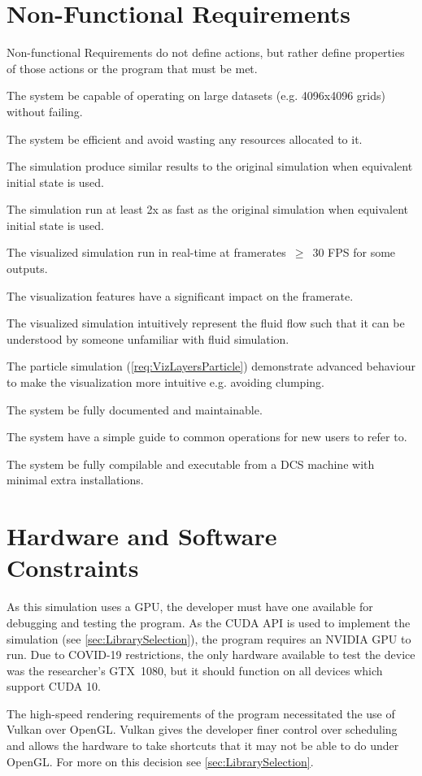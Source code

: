 \section{Non-Functional Requirements}
Non-functional Requirements do not define actions, but rather define properties of those actions or the program that must be met.
\begin{reqNF}
    \item \label{reqN:LargeData} The system \must{} be capable of operating on large datasets (e.g. 4096x4096 grids) without failing.
    \item \label{reqN:Resources} The system \must{} be efficient and avoid wasting any resources allocated to it.
    \item \label{reqN:SimilarOutput} The simulation \must{} produce similar results to the original simulation when equivalent initial state is used.
    \item \label{reqN:SimSpeed} The simulation \should{} run at least 2x as fast as the original simulation when equivalent initial state is used.
    \item \label{reqN:Realtime} The visualized simulation \must{} run in real-time at framerates~$\ge$~30 FPS for some outputs.
    \item \label{reqN:VizSpeed} The visualization features \shouldnt{} have a significant impact on the framerate.
    \item \label{reqN:Intuitive} The visualized simulation \should{} intuitively represent the fluid flow such that it can be understood by someone unfamiliar with fluid simulation.
    \item \label{reqN:VizParticleAdvanced} The particle simulation (\cref{req:VizLayersParticle}) \should{} demonstrate advanced behaviour to make the visualization more intuitive e.g. avoiding clumping.
    \item \label{reqN:Documented} The system \must{} be fully documented and maintainable. %
    \item \label{reqN:UsageGuide} The system \should{} have a simple guide to common operations for new users to refer to.
    \item \label{reqN:DCSCompile} The system \should{} be fully compilable and executable from a DCS machine with minimal extra installations.
\end{reqNF}

\section{Hardware and Software Constraints}
\label{sec:Requirements_HardwareSoftware}
As this simulation uses a GPU, the developer must have one available for debugging and testing the program.
As the CUDA API is used to implement the simulation (see \cref{sec:LibrarySelection}), the program requires an NVIDIA GPU to run.
Due to COVID-19 restrictions, the only hardware available to test the device was the researcher's GTX~1080, but it should function on all devices which support CUDA 10.

The high-speed rendering requirements of the program necessitated the use of Vulkan over OpenGL.
Vulkan gives the developer finer control over scheduling and allows the hardware to take shortcuts that it may not be able to do under OpenGL.
For more on this decision see \cref{sec:LibrarySelection}.